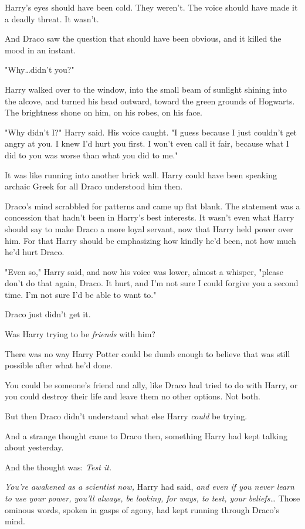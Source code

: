 Harry's eyes should have been cold. They weren't. The voice should have made it
a deadly threat. It wasn't.

And Draco saw the question that should have been obvious, and it killed the
mood in an instant.

"Why…didn't you?"

Harry walked over to the window, into the small beam of sunlight shining into
the alcove, and turned his head outward, toward the green grounds of Hogwarts.
The brightness shone on him, on his robes, on his face.

"Why didn't I?" Harry said. His voice caught. "I guess because I just couldn't
get angry at you. I knew I'd hurt you first. I won't even call it fair, because
what I did to you was worse than what you did to me."

It was like running into another brick wall. Harry could have been speaking
archaic Greek for all Draco understood him then.

Draco's mind scrabbled for patterns and came up flat blank. The statement was a
concession that hadn't been in Harry's best interests. It wasn't even what
Harry should say to make Draco a more loyal servant, now that Harry held power
over him. For that Harry should be emphasizing how kindly he'd been, not how
much he'd hurt Draco.

"Even so," Harry said, and now his voice was lower, almost a whisper, "please
don't do that again, Draco. It hurt, and I'm not sure I could forgive you a
second time. I'm not sure I'd be able to want to."

Draco just didn't get it.

Was Harry trying to be \emph{friends} with him?

There was no way Harry Potter could be dumb enough to believe that was still
possible after what he'd done.

You could be someone's friend and ally, like Draco had tried to do with Harry,
or you could destroy their life and leave them no other options. Not both.

But then Draco didn't understand what else Harry \emph{could} be trying.

And a strange thought came to Draco then, something Harry had kept talking
about yesterday.

And the thought was: \emph{Test it.}

\emph{You're awakened as a scientist now,} Harry had said, \emph{and even if
you never learn to use your power, you'll always, be looking, for ways, to
test, your beliefs…} Those ominous words, spoken in gasps of agony, had
kept running through Draco's mind.

